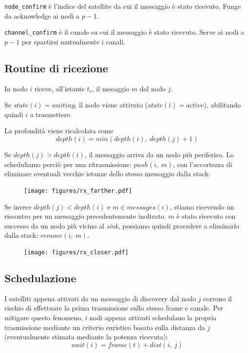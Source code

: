 \documentclass[a4paper,12pt]{article}
\theoremstyle{definition}
\begin{document}
\texttt{node\_confirm} è l'indice del satellite da cui il messaggio è stato ricevuto. Funge da acknowledge ai nodi a $p-1$.

\texttt{channel\_confirm} è il canale su cui il messaggio è stato ricevuto. Serve ai nodi a $p-1$ per spartirsi mutualmente i canali.

\subsection{Routine di ricezione}

In nodo $i$ riceve, all'istante $t_r$, il mesaggio $m$ dal nodo $j$.

Se $state(i) = waiting$, il nodo viene attivato ($state(i) = active$), abilitando quindi $i$ a trasmettere.

La profondità viene ricalcolata come
\begin{equation*}
depth(i) = min(depth(i),\ depth(j)+1)
\end{equation*}

Se $depth(j) > depth(i)$, il messaggio arriva da un nodo più periferico. Lo scheduliamo perciò per una ritrasmissione: $push(i,\ m)$, con l'accortezza di eliminare eventuali vecchie istanze dello stesso messaggio dalla stack.

\begin{figure}[H]
\centering
\texttt{[image: figures/rx\_farther.pdf]}
\caption{}
\end{figure}

Se invece $depth(j) < depth(i)$ e $m \in messages(i)$, stiamo ricevendo un riscontro per un messaggio precedentemente inoltrato. $m$ è stato ricevuto con successo da un nodo più vicino al \emph{sink}, possiamo quindi procedere a eliminarlo dalla stack: $remove(i,\ m)$.

\begin{figure}[H]
\centering
\texttt{[image: figures/rx\_closer.pdf]}
\caption{}
\end{figure}

\subsection{Schedulazione}

I satelliti appena attivati da un messaggio di discovery dal nodo $j$ corrono il rischio di effettuare la prima trasmissione sullo stesso frame e canale. Per mitigare questo fenomeno, i nodi appena attivati schedulano la propria trasmissione mediante un criterio euristico basato sulla distanza da $j$ (eventualmente stimata mediante la potenza ricevuta):
\begin{equation*}
wait(i) = frame(t) + dist(i,\ j)
\end{equation*}
\end{document}
